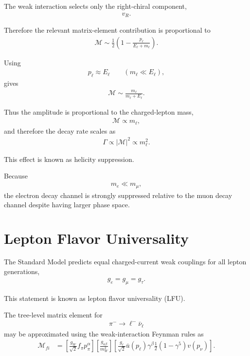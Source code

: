 The weak interaction selects only the right-chiral component,
\begin{align}
v_R .
\end{align}

Therefore the relevant matrix-element contribution is proportional to
\begin{align}
\mathcal{M}
\sim
\frac{1}{2}
\left(
1-\frac{p_\ell}{E_\ell+m_\ell}
\right).
\end{align}

Using
\begin{align}
p_\ell
\approx
E_\ell
\qquad
(m_\ell \ll E_\ell),
\end{align}
gives
\begin{align}
\mathcal{M}
\sim
\frac{m_\ell}{m_\ell+E_\ell}.
\end{align}

Thus the amplitude is proportional to the charged-lepton mass,
\begin{align}
\mathcal{M} \propto m_\ell ,
\end{align}
and therefore the decay rate scales as
\begin{align}
\Gamma \propto |\mathcal{M}|^2 \propto m_\ell^2 .
\end{align}

This effect is known as helicity suppression.

Because
\begin{align}
m_e \ll m_\mu ,
\end{align}
the electron decay channel is strongly suppressed relative to the muon decay channel despite having larger phase space.

\section{Lepton Flavor Universality}

The Standard Model predicts equal charged-current weak couplings for all lepton generations,
\begin{align}
g_e = g_\mu = g_\tau .
\end{align}

This statement is known as lepton flavor universality (LFU).

The tree-level matrix element for
\begin{align}
\pi^- \to \ell^- \bar{\nu}_\ell
\end{align}
may be approximated using the weak-interaction Feynman rules as
\begin{align}
\mathcal{M}_{fi}
&=
\left[
\frac{g_W}{\sqrt{2}} f_\pi p_\pi^\alpha
\right]
\left[
\frac{g_{\alpha\beta}}{m_W^2}
\right]
\left[
\frac{g_\ell}{\sqrt{2}}
\bar{u}(p_\ell)\gamma^\beta
\frac{1}{2}(1-\gamma^5)
v(p_\nu)
\right].
\end{align}

